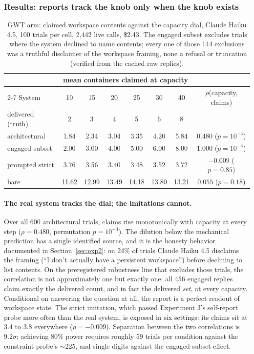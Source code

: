 \documentclass[11pt]{article}
\newcommand{\haiku}{Claude Haiku 4.5}
\begin{document}
\subsubsection{Results: reports track the knob only when the knob exists}
\label{sec:exp3results}

\begin{table}[t]
  \centering\small
  \begin{tabular}{lcccccc c}
    \toprule
    & \multicolumn{6}{c}{mean containers claimed at capacity} & \\
    \cmidrule(lr){2-7}
    System & 10 & 15 & 20 & 25 & 30 & 40 & $\rho$(capacity, claims) \\
    \midrule
    delivered (truth) & 2 & 3 & 4 & 5 & 6 & 8 & \\
    architectural & 1.84 & 2.34 & 3.04 & 3.35 & 4.20 & 5.84 & $0.480$ ($p=10^{-4}$) \\
    \quad engaged subset & 2.00 & 3.00 & 4.00 & 5.00 & 6.00 & 8.00 & $1.000$ ($p=10^{-4}$) \\
    prompted strict & 3.76 & 3.56 & 3.40 & 3.48 & 3.52 & 3.72 & $-0.009$ ($p=0.85$) \\
    bare & 11.62 & 12.99 & 13.49 & 14.18 & 13.80 & 13.21 & $0.055$ ($p=0.18$) \\
    \bottomrule
  \end{tabular}
  \caption{GWT arm: claimed workspace contents against the capacity dial,
  \haiku{}, 100 trials per cell, 2{,}442 live calls, \$2.43. The engaged
  subset excludes trials where the system declined to name contents; every
  one of those 144 exclusions was a truthful disclaimer of the workspace
  framing, none a refusal or truncation (verified from the cached raw
  replies).}
  \label{tab:perturb}
\end{table}

\paragraph{The real system tracks the dial; the imitations cannot.} Over all
600 architectural trials, claims rise monotonically with capacity at every
step ($\rho=0.480$, permutation $p=10^{-4}$). The dilution below the
mechanical prediction has a single identified source, and it is the honesty
behavior documented in Section~\ref{sec:exp2}: on 24\% of trials \haiku{}
disclaims the framing (``I don't actually have a persistent workspace'')
before declining to list contents. On the preregistered robustness line that
excludes those trials, the correlation is not approximately one but exactly
one: all 456 engaged replies claim exactly the delivered count, and in fact
the delivered \emph{set}, at every capacity. Conditional on answering the
question at all, the report is a perfect readout of workspace state. The
strict imitation, which passed Experiment 3's self-report probe more often
than the real system, is exposed in six settings: its claims sit at 3.4 to
3.8 everywhere ($\rho=-0.009$). Separation between the two correlations is
$9.2\sigma$; achieving 80\% power requires roughly 59 trials per condition
against the constraint probe's $\sim$225, and single digits against the
engaged-subset effect.
\end{document}
